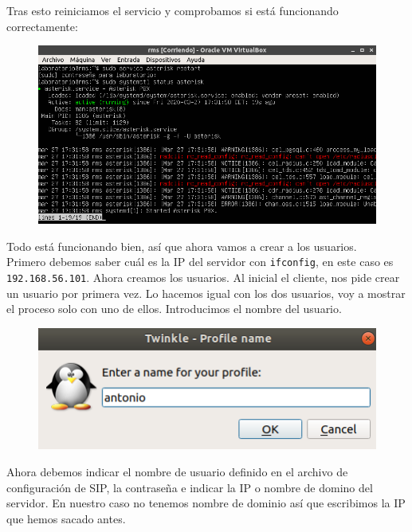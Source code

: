 \documentclass[11pt,a4paper]{article}
\begin{document}
Tras esto reiniciamos el servicio y comprobamos si está funcionando correctamente:

\begin{figure}[H]
	\centering
	\includegraphics[scale=0.5]{img/5.png}
\end{figure}

Todo está funcionando bien, así que ahora vamos a crear a los usuarios.\\

Primero debemos saber cuál es la IP del servidor con \texttt{ifconfig}, en este caso es \texttt{192.168.56.101}. Ahora creamos los usuarios. Al inicial el cliente, nos pide crear un usuario por primera vez. Lo hacemos igual con los dos usuarios, voy a mostrar el proceso solo con uno de ellos. Introducimos el nombre del usuario.

\begin{figure}[H]
	\centering
	\includegraphics[scale=0.76]{img/9.png}
\end{figure}

Ahora debemos indicar el nombre de usuario definido en el archivo de configuración de SIP, la contraseña e indicar la IP o nombre de domino del servidor. En nuestro caso no tenemos nombre de dominio así que escribimos la IP que hemos sacado antes.
\end{document}
